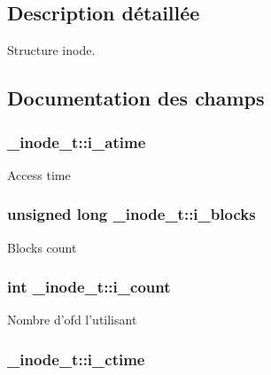 \subsection{Description détaillée}
Structure inode. 

\subsection{Documentation des champs}
\hypertarget{struct__inode__t_a01f50c6c44a3b50e4414a794643b741f}{
\subsubsection[{i\-\_\-atime}]{ \-\_\-inode\-\_\-t\-::i\-\_\-atime}}\label{struct__inode__t_a01f50c6c44a3b50e4414a794643b741f}
Access time \hypertarget{struct__inode__t_a92ebe4c1e93af9fba4efae4d07e14858}{
\subsubsection[{i\-\_\-blocks}]{\setlength{\rightskip}{0pt plus 5cm}unsigned long \-\_\-inode\-\_\-t\-::i\-\_\-blocks}}\label{struct__inode__t_a92ebe4c1e93af9fba4efae4d07e14858}
Blocks count \hypertarget{struct__inode__t_a8ea768d56d01e010bc0c809bc38dbb28}{
\subsubsection[{i\-\_\-count}]{\setlength{\rightskip}{0pt plus 5cm}int \-\_\-inode\-\_\-t\-::i\-\_\-count}}\label{struct__inode__t_a8ea768d56d01e010bc0c809bc38dbb28}
Nombre d'ofd l'utilisant \hypertarget{struct__inode__t_a73ee1e604547b74b8e1045fd4f6699b6}{
\subsubsection[{i\-\_\-ctime}]{ \-\_\-inode\-\_\-t\-::i\-\_\-ctime}}\label{struct__inode__t_a73ee1e604547b74b8e1045fd4f6699b6}
